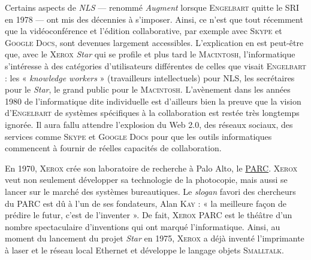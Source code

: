 Certains aspects de \textit{NLS} --- renommé \textit{Augment} lorsque \textsc{Engelbart} quit\-te le SRI en 1978 --- ont mis des décennies à s'imposer. Ainsi, ce n’est que tout récemment que la vidéoconférence et l’édition collaborative, par exemple avec \textsc{Skype} et \textsc{Google Docs}, sont devenues largement accessibles. L'explication en est peut-être que, avec le \textsc{Xerox} \textit{Star} qui se profile et plus tard le \textsc{Macintosh}, l'informatique s'intéresse à des catégories d'utilisateurs différentes de celles que visait \textsc{Engelbart} : les « \textit{knowledge workers} » (travailleurs intellectuels) pour NLS, les secrétaires pour le \textit{Star}, le grand public pour le \textsc{Macintosh}. L'avènement dans les années 1980 de l'informatique dite individuelle est d'ailleurs bien la preuve que la vision d'\textsc{Engelbart} de systèmes spécifiques à la collaboration est restée très longtemps ignorée. Il aura fallu attendre l’explosion du Web 2.0, des réseaux sociaux, des services comme \textsc{Skype} et \textsc{Google Doc}s pour que les outils informatiques commencent à fournir de réelles capacités de collaboration.




En 1970, \textsc{Xerox} crée son laboratoire de recherche à Palo Alto, le \href{https://interstices.info/xerox-parc-et-la-naissance-de-linformatique-contemporaine/}{PARC}. \textsc{Xerox} veut non seulement développer sa technologie de la photocopie, mais aussi se lancer sur le marché des systèmes bureautiques. Le \textit{slogan} favori des chercheurs du PARC est dû à l'un de ses fondateurs, Alan \textsc{Kay} : « la meilleure façon de prédire le futur, c'est de l'inventer ». De fait, \textsc{Xerox PARC} est le théâtre d'un nombre spectaculaire d'inventions qui ont marqué l'informatique. Ainsi, au moment du lancement du projet \textit{Star} en 1975, \textsc{Xerox} a déjà inventé l'imprimante à laser et le réseau local Ethernet et développe le langage objets \textsc{Smalltalk}.

